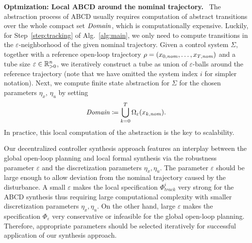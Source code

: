 \smallskip
\noindent\textbf{Optmization: Local ABCD around the nominal trajectory.}\
%
The abstraction process of ABCD usually requires computation of abstract transitions over the whole compact set $\mathit{Domain}$, which is computationally expensive.
Luckily, for Step~\ref{step:tracking} of Alg.~\ref{alg:main}, we only need to compute transitions in the $\varepsilon$-neighborhood of the given nominal trajectory.
Given a control system $\Sigma$, together with a reference open-loop trajectory $\rho=(x_{0,\mathit{nom}},\ldots,x_{T,\mathit{nom}})$ and a tube size $\varepsilon\in \mathbb{R}_{>0}^n$, we iteratively construct a tube as union of $\varepsilon$-balls around the reference trajectory (note that we have omitted  the system index $i$ for simpler notation).
Next, we compute finite state abstraction for $\Sigma$ for the chosen parameters $\eta_x$, $\eta_u$ by setting
\begin{equation*}
\mathit{Domain}\coloneqq\bigcup_{k=0}^T\Omega_{\varepsilon}(x_{k,\mathit{nom}}).
\end{equation*}
%
In practice, this local computation of the abstraction is the key to scalability.
\begin{remark}
Our decentralized controller synthesis approach features an interplay between the global open-loop planning and local formal synthesis via the robustness parameter $\varepsilon$ and the discretization parameters $\eta_x,\eta_u$.  The parameter $\varepsilon$ should be large enough to allow deviation from the nominal trajectory caused by the disturbance. A small $\varepsilon$ makes the local specification $\Phi^i_{track}$ very strong for the ABCD synthesis thus requiring large computational complexity with smaller discretization parameters $\eta_x,\eta_u$. On the other hand, large $\varepsilon$ makes the specification $\Phi_\varepsilon$ very conservative or infeasible for the global open-loop planning. Therefore, appropriate parameters should be selected iteratively for successful application of our synthesis approach. 
\end{remark}
% 


